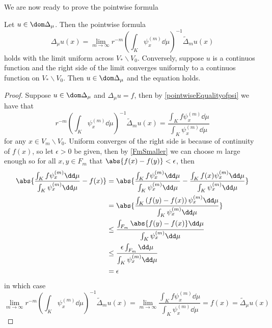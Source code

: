 We are now ready to prove the pointwise formula

\begin{theorem} \label{pointwiseFormula}
	Let $u \in \dom \Delta_\mu$. Then the pointwise formula
	\begin{equation}
		\Delta_{\mu} u(x) = \lim_{m \to \infty} r^{-m} \left(\int_{K} \psi_x^{(m)} \dd \mu \right)^{-1} \widetilde{\Delta}_m u(x)
	\end{equation}
	holds with the limit uniform across $V_* \backslash V_0$. Conversely, suppose $u$ is a continuos function and the right side of the limit converges uniformly to a continuos function on $V_* \backslash V_0$. Then $u \in \dom \Delta_{\mu}$ and the equation holds.
\end{theorem}

\begin{proof}
	Suppose $u \in \dom \Delta_{\mu}$ and $\Delta_{\mu} u=f$, then by \cref{pointwiseEqualityofpsi} we have that 
	\begin{equation}
		r^{-m} \left(\int_{K} \psi^{(m)}_{x} \dd\mu \right)^{-1} \widetilde{\Delta}_m u(x) = \frac{\int_{K} f \psi_x^{(m)} \dd\mu}{\int_{K} \psi_x^{(m)} \dd\mu}
	\end{equation}
	for any $x \in V_m \backslash V_0$. Uniform converges of the right side is because of continuity of $f(x)$, so let $\epsilon > 0$ be given, then by \cref{FmSmaller} we can choose $m$ large enough so for all $x, y \in F_m$ that $\abs{f(x) - f(y)} < \epsilon$, then
	\begin{align}
		\abs{\frac{\int_{K} f \psi_x^{(m)} \dd\mu}{\int_{K} \psi_x^{(m)} \dd\mu} - f(x)} &= \abs{\frac{\int_{K} f \psi_x^{(m)} \dd\mu}{\int_{K} \psi_x^{(m)} \dd\mu} - \frac{\int_{K} f(x) \psi_x^{(m)} \dd\mu}{\int_{K} \psi_x^{(m)} \dd\mu}} \\
		&= \abs{\frac{\int_{K} \left(f(y) -f(x) \right) \psi_x^{(m)} \dd\mu}{\int_{K} \psi_x^{(m)} \dd\mu}} \\
		&\leq \frac{\int_{F_m} \abs{f(y) -f(x)} \dd\mu}{\int_{K} \psi_x^{(m)} \dd\mu} \\
		&\leq \frac{\epsilon \int_{F_m} \dd\mu}{\int_{K} \psi_x^{(m)} \dd\mu} \\
		&= \epsilon
	\end{align}
	in which case
	\begin{equation}
		\lim_{m \to \infty} r^{-m} \left(\int_{K} \psi^{(m)}_{x} \dd\mu \right)^{-1} \widetilde{\Delta}_m u(x) = \lim_{m \to \infty} \frac{\int_{K} f \psi_x^{(m)} \dd \mu}{\int_{K} \psi_x^{(m)} \dd \mu} = f(x) = \widetilde{\Delta}_{\mu} u(x)
	\end{equation}
	

\end{proof}
